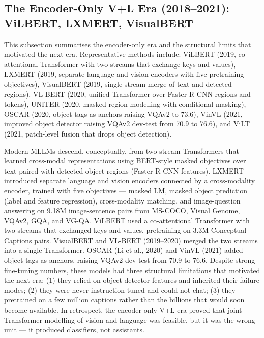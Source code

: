 \documentclass{article}
\begin{document}
\subsection{The Encoder-Only V+L Era (2018--2021): ViLBERT, LXMERT, VisualBERT}\label{the-encoder-only-vl-era-20182021-vilbert-lxmert-visualbert}

This subsection summarises the encoder-only era and the structural limits that motivated the next era. Representative methods include: ViLBERT (2019, co-attentional Transformer with two streams that exchange keys and values), LXMERT (2019, separate language and vision encoders with five pretraining objectives), VisualBERT (2019, single-stream merge of text and detected regions), VL-BERT (2020, unified Transformer over Faster R-CNN regions and tokens), UNITER (2020, masked region modelling with conditional masking), OSCAR (2020, object tags as anchors raising VQAv2 to 73.6), VinVL (2021, improved object detector raising VQAv2 dev-test from 70.9 to 76.6), and ViLT (2021, patch-level fusion that drops object detection).

Modern MLLMs descend, conceptually, from two-stream Transformers that learned cross-modal representations using BERT-style masked objectives over text paired with detected object regions (Faster R-CNN features). LXMERT \citep{tan2019lxmertlearningcros} introduced separate language and vision encoders connected by a cross-modality encoder, trained with five objectives --- masked LM, masked object prediction (label and feature regression), cross-modality matching, and image-question answering on 9.18M image-sentence pairs from MS-COCO, Visual Genome, VQAv2, GQA, and VG-QA. ViLBERT \citep{lu2019vilbertpretraining} used a co-attentional Transformer with two streams that exchanged keys and values, pretraining on 3.3M Conceptual Captions pairs. VisualBERT and VL-BERT (2019--2020) merged the two streams into a single Transformer. OSCAR (Li et al., 2020) and VinVL (2021) added object tags as anchors, raising VQAv2 dev-test from 70.9 to 76.6. Despite strong fine-tuning numbers, these models had three structural limitations that motivated the next era: (1) they relied on object detector features and inherited their failure modes; (2) they were never instruction-tuned and could not chat; (3) they pretrained on a few million captions rather than the billions that would soon become available. In retrospect, the encoder-only V+L era proved that joint Transformer modelling of vision and language was feasible, but it was the wrong unit --- it produced classifiers, not assistants.
\end{document}
